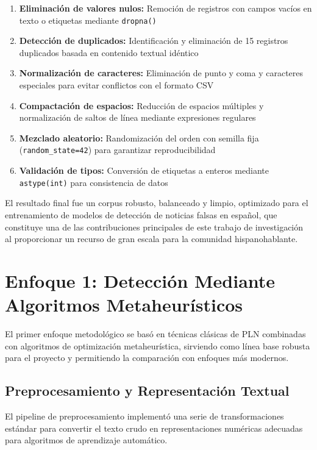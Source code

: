 \begin{enumerate}
    \item \textbf{Eliminación de valores nulos:} Remoción de registros con campos vacíos en texto o etiquetas mediante \texttt{dropna()}
    \item \textbf{Detección de duplicados:} Identificación y eliminación de 15 registros duplicados basada en contenido textual idéntico
    \item \textbf{Normalización de caracteres:} Eliminación de punto y coma y caracteres especiales para evitar conflictos con el formato CSV
    \item \textbf{Compactación de espacios:} Reducción de espacios múltiples y normalización de saltos de línea mediante expresiones regulares
    \item \textbf{Mezclado aleatorio:} Randomización del orden con semilla fija (\texttt{random\_state=42}) para garantizar reproducibilidad
    \item \textbf{Validación de tipos:} Conversión de etiquetas a enteros mediante \texttt{astype(int)} para consistencia de datos
\end{enumerate}

El resultado final fue un corpus robusto, balanceado y limpio, optimizado para el entrenamiento de modelos de detección de noticias falsas en español, que constituye una de las contribuciones principales de este trabajo de investigación al proporcionar un recurso de gran escala para la comunidad hispanohablante.


\section{Enfoque 1: Detección Mediante Algoritmos Metaheurísticos}
\label{sec:enfoque_metaheuristico}

El primer enfoque metodológico se basó en técnicas clásicas de PLN combinadas con algoritmos de optimización metaheurística, sirviendo como línea base robusta para el proyecto y permitiendo la comparación con enfoques más modernos.

\subsection{Preprocesamiento y Representación Textual}

El pipeline de preprocesamiento implementó una serie de transformaciones estándar para convertir el texto crudo en representaciones numéricas adecuadas para algoritmos de aprendizaje automático.

